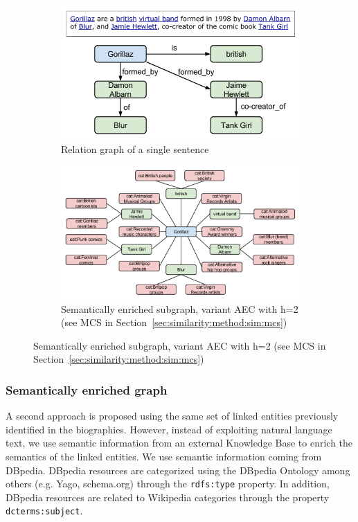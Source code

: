 \begin{figure}[ht!]
    \centering
    \begin{subfigure}{\textwidth}
        \centering
        \includegraphics[width=.7\linewidth]{ch06_similarity_pics/RelationGraph.png}
    	\caption{Relation graph of a single sentence}
        \label{fig:similarity:relation}
    \end{subfigure}
    \begin{subfigure}{\textwidth}
        \centering
        \includegraphics[width=.9\linewidth]{ch06_similarity_pics/EnrichedGraph2.png}
		\caption{Semantically enriched subgraph, variant AEC with h=2 (see MCS in Section~\ref{sec:similarity:method:sim:mcs})}
		\label{fig:similarity:enriched}
    \end{subfigure}
\end{figure}



\subsubsection{Semantically enriched graph}\label{sec:similarity:semantic_enriched_graph} %

A second approach is proposed using the same set of linked entities previously identified in the biographies. However, instead of exploiting natural language text, we use semantic information from an external Knowledge Base to enrich the semantics of the linked entities. We use semantic information coming from DBpedia. DBpedia resources are categorized using the DBpedia Ontology among others (e.g. Yago, schema.org) through the \texttt{rdfs:type} property. In addition, DBpedia resources are related to Wikipedia categories through the property \texttt{dcterms:subject}.


